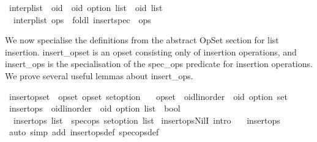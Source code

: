 \begin{isabellebody}
\begin{isamarkuptext}
\end{isamarkuptext}\isamarkuptrue%
\isamarkupfalse%
\ interp{\isacharunderscore}list\ {\isacharcolon}{\isacharcolon}\ {\isachardoublequoteopen}{\isacharparenleft}{\isacharprime}oid\ {\isasymtimes}\ {\isacharprime}oid\ option{\isacharparenright}\ list\ {\isasymRightarrow}\ {\isacharprime}oid\ list{\isachardoublequoteclose}\ \isanewline
\ \ {\isachardoublequoteopen}interp{\isacharunderscore}list\ ops\ {\isasymequiv}\ foldl\ insert{\isacharunderscore}spec\ {\isacharbrackleft}{\isacharbrackright}\ ops{\isachardoublequoteclose}%
\isamarkuptrue%
%
\begin{isamarkuptext}%
We now specialise the definitions from the abstract OpSet section for list
insertion. insert\_opset is an opset consisting only of insertion operations,
and insert\_ops is the specialisation of the spec\_ops predicate for
insertion operations. We prove several useful lemmas about insert\_ops.%
\end{isamarkuptext}\isamarkuptrue%
\isamarkupfalse%
\ insert{\isacharunderscore}opset\ {\isacharequal}\ opset\ opset\ set{\isacharunderscore}option\isanewline
\ \ \ opset\ {\isacharcolon}{\isacharcolon}\ {\isachardoublequoteopen}{\isacharparenleft}{\isacharprime}oid{\isacharcolon}{\isacharcolon}{\isacharbraceleft}linorder{\isacharbraceright}\ {\isasymtimes}\ {\isacharprime}oid\ option{\isacharparenright}\ set{\isachardoublequoteclose}\isanewline
\isanewline
{}\isamarkupfalse%
\ insert{\isacharunderscore}ops\ {\isacharcolon}{\isacharcolon}\ {\isachardoublequoteopen}{\isacharparenleft}{\isacharprime}oid{\isacharcolon}{\isacharcolon}{\isacharbraceleft}linorder{\isacharbraceright}\ {\isasymtimes}\ {\isacharprime}oid\ option{\isacharparenright}\ list\ {\isasymRightarrow}\ bool{\isachardoublequoteclose}\ \isanewline
\ \ {\isachardoublequoteopen}insert{\isacharunderscore}ops\ list\ {\isasymequiv}\ spec{\isacharunderscore}ops\ set{\isacharunderscore}option\ list{\isachardoublequoteclose}\isanewline
\isanewline
{}\isamarkupfalse%
\ insert{\isacharunderscore}ops{\isacharunderscore}NilI\ {\isacharbrackleft}intro{\isacharbang}{\isacharbrackright}{\isacharcolon}\isanewline
\ \ \ {\isachardoublequoteopen}insert{\isacharunderscore}ops\ {\isacharbrackleft}{\isacharbrackright}{\isachardoublequoteclose}\isanewline
%
\isadelimproof
%
\endisadelimproof
%
\isatagproof
{}\isamarkupfalse%
\ {\isacharparenleft}auto\ simp\ add{\isacharcolon}\ insert{\isacharunderscore}ops{\isacharunderscore}def\ spec{\isacharunderscore}ops{\isacharunderscore}def{\isacharparenright}%

\end{isabellebody}
